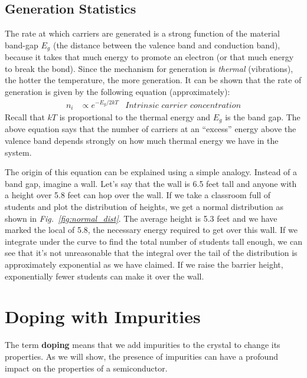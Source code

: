 \subsection{Generation Statistics}
 The rate at which carriers are generated is a strong function of the material band-gap $E_g$ (the distance between the valence band and conduction band), because it takes that much energy to promote an electron (or that much energy to break the bond).  Since the mechanism for generation is \textit{thermal} (vibrations), the hotter the temperature, the more generation.    It can be shown that the rate of generation is given by the following equation (approximately):
    \begin{align}
        n_i &\propto e^{-E_g/2kT} &\textit{Intrinsic carrier concentration}
    \end{align}
Recall that $kT$ is proportional to the thermal energy and  $E_g$ is the band gap.  The above equation says that the number of carriers at an “excess” energy above the valence band depends strongly on how much thermal energy we have in the system.

The origin of this equation can be explained using a simple analogy.  Instead of a band gap, imagine a wall.  Let’s say that the wall is 6.5 feet tall and anyone with a height over 5.8 feet can hop over the wall.  If we take a classroom full of students and plot the distribution of heights, we get a normal distribution as shown in \emph{Fig.~\ref{fig:normal_dist}}.  The average height is 5.3 feet and we have marked the local of 5.8, the necessary energy required to get over this wall.  If we integrate under the curve to find the total number of students tall enough, we can see that it’s not unreasonable that the integral over the tail of the distribution is approximately exponential as we have claimed.  If we raise the barrier height, exponentially fewer students can make it over the wall.
\section{Doping with Impurities}
The term \textbf{doping} means that we add impurities to the crystal to change its properties.  As we will show, the presence of impurities can have a profound impact on the properties of a semiconductor.
